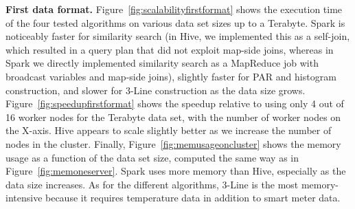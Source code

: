 \documentclass[prodmode,acmtods]{acmsmall}
\begin{document}
\begin{figure*}[t]
 \centering
 \hspace{-8pt}
 \hspace{-8pt}
 \hspace{-8pt}
 \caption{Memory consumption of each algorithm in Spark and Hive.}
  \label{fig:memusageoncluster}
\end{figure*}

{\bf First data format.}
Figure~\ref{fig:scalabilityfirstformat} shows the execution time of the four tested algorithms on various data set sizes up to a Terabyte.  Spark is noticeably faster for similarity search (in Hive, we implemented this as a self-join, which resulted in a query plan that did not exploit map-side joins, whereas in Spark we directly implemented similarity search as a MapReduce job with broadcast variables and map-side joins), slightly faster for PAR and histogram construction, and slower for 3-Line construction as the data size grows. 
Figure~\ref{fig:speedupfirstformat} shows the speedup relative to using only 4 out of 16 worker nodes for the Terabyte data set, with the number of worker nodes on the X-axis.  Hive appears to scale slightly better as we increase the number of nodes in the cluster.
Finally, Figure~\ref{fig:memusageoncluster} shows the memory usage as a function of the data set size, computed the same way as in Figure~\ref{fig:memoneserver}.  Spark uses more memory than Hive, especially as the data size increases.  As for the different algorithms, 3-Line is the most memory-intensive because it requires temperature data in addition to smart meter data.

\begin{figure*}[t]
 \centering
 \hspace{-5pt}
 \hspace{-5pt}
 \hspace{-5pt}
 \caption{Execution times using the second data format in Spark and Hive.}
  \label{fig:scalabilitysecondformat}
\end{figure*}
\end{document}
